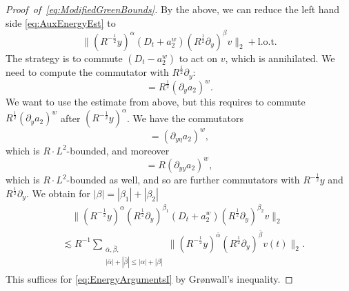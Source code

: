\documentclass{amsart}
\theoremstyle{definition}
\begin{document}
\begin{proof}[Proof~of~\eqref{eq:ModifiedGreenBounds}]
By the above, we can reduce the left hand side \eqref{eq:AuxEnergyEst} to
\begin{equation*}
\| (R^{-\frac{1}{2}} y)^{\alpha} (D_t + a_{2}^w) (R^{\frac{1}{2}} \partial_y)^{\beta} v \|_2 + \text{l.o.t.}
\end{equation*}
The strategy is to commute $(D_t - a_{2}^w)$ to act on $v$, which is annihilated. We need to compute the commutator with $R^{\frac{1}{2}} \partial_y$:
\begin{equation*}
[a_2^w, R^{\frac{1}{2}} \partial_y] = R^{\frac{1}{2}} (\partial_y a_2)^w.
\end{equation*}
We want to use the estimate from above, but this requires to commute $R^{\frac{1}{2}} (\partial_y a_2)^w$ after $(R^{-\frac{1}{2}} y)^{\alpha}$.
We have the commutators
\begin{equation*}
[ (R^{-\frac{1}{2}} y), R^{\frac{1}{2}} (\partial_y a_2)^w] =  (\partial_{y \eta} a_2)^w,
\end{equation*}
which is $R \cdot L^2$-bounded, and moreover
\begin{equation*}
[ R^{\frac{1}{2}} \partial_y, R^{\frac{1}{2}} (\partial_y a_2)^w] = R (\partial_{yy} a_2)^w,
\end{equation*}
which is $R \cdot L^2$-bounded as well, and so are further commutators with $R^{-\frac{1}{2}} y$ and $R^{\frac{1}{2}} \partial_y$. We obtain for $|\beta|= |\beta_1| + |\beta_2|$
\begin{equation*}
\begin{split}
&\quad \| ( R^{-\frac{1}{2}} y)^{\alpha} (R^{\frac{1}{2}} \partial_y)^{\beta_1} (D_t + a_{2}^w) (R^{\frac{1}{2}} \partial_y)^{\beta_2} v \|_2 \\ 
&\lesssim R^{-1} \sum_{\substack{\bar{\alpha},\bar{\beta}, \\ |\bar{\alpha}| + |\bar{\beta}| \leq |\alpha| + |\beta|}} \| (R^{-\frac{1}{2}} y)^{\bar{\alpha}} (R^{\frac{1}{2}} \partial_y)^{\bar{\beta}} v(t) \|_2.
\end{split}
\end{equation*}
This suffices for \eqref{eq:EnergyArgumentsI} by Gr\o nwall's inequality.


\end{proof}
\end{document}

